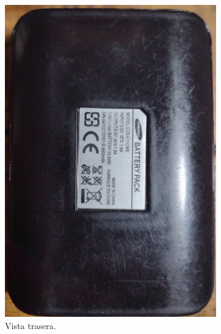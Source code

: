 \documentclass[11pt,a4paper]{article}
\begin{document}
\begin{figure}[h!]
\begin{subfigure}{0.3\textwidth}
			\includegraphics[width=\textwidth]{imagenes/battery_pack2.jpg}
			\caption{Vista trasera.}
		\end{subfigure}
		\hfill
		\begin{subfigure}{0.2\textwidth}

\end{subfigure}
\end{figure}
\end{document}
